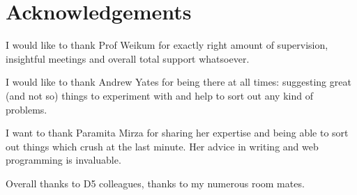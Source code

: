 \section*{Acknowledgements}

I would like to thank Prof Weikum for exactly right amount of supervision, insightful meetings and overall total support whatsoever.

I would like to thank Andrew Yates for being there at all times: suggesting great (and not so) things to experiment with and help to sort out any kind of problems.

I want to thank Paramita Mirza for sharing her expertise and being able to sort out things which crush at the last minute. Her advice in writing and web programming is invaluable.

Overall thanks to D5 colleagues, thanks to my numerous room mates.